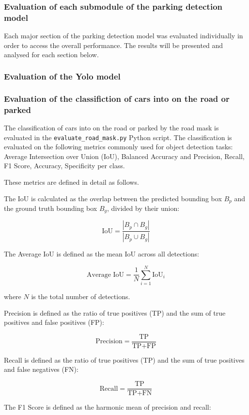 \subsubsection{Evaluation of each submodule of the parking detection model}
Each major section of the parking detection model was evaluated individually in order to access the overall performance. The results will be presented and analysed for each section below.

\subsubsection{Evaluation of the Yolo model}


\subsubsection{Evaluation of the classifiction of cars into on the road or parked}
The classification of cars into on the road or parked by the road mask is evaluated in the \texttt{evaluate\_road\_mask.py} Python script.
The classification is evaluated on the following metrics commonly used for object detection tasks: Average Intersection over Union (IoU), Balanced Accuracy and Precision, Recall, F1 Score, Accuracy, Specificity per class.

These metrics are defined in detail as follows.

The IoU is calculated as the overlap between the predicted bounding box \( B_p \) and the ground truth bounding box \( B_g \), divided by their union:

\[
\text{IoU} = \frac{|B_p \cap B_g|}{|B_p \cup B_g|}
\]

The Average IoU is defined as the mean IoU across all detections:

\[
\text{Average IoU} = \frac{1}{N} \sum_{i=1}^{N} \text{IoU}_i
\]

where \( N \) is the total number of detections.

Precision is defined as the ratio of true positives (TP) and the sum of true positives and false positives (FP):

\[
\text{Precision} = \frac{\text{TP}}{\text{TP} + \text{FP}}
\]

Recall is defined as the ratio of true positives (TP) and the sum of true positives and false negatives (FN):

\[
\text{Recall} = \frac{\text{TP}}{\text{TP} + \text{FN}}
\]

The F1 Score is defined as the harmonic mean of precision and recall:

